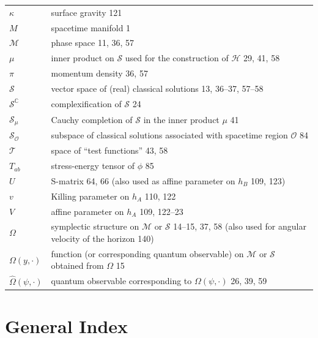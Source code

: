 \documentclass[11pt,a4paper]{article}
\begin{document}
\begin{longtable}[]{@{}
  >{\raggedright\arraybackslash}p{}
  >{\raggedright\arraybackslash}p{}@{}}
\(\kappa\) & surface gravity 121 \\
\(M\) & spacetime manifold 1 \\
\(\mathcal{M}\) & phase space 11, 36, 57 \\
\(\mu\) & inner product on \(\mathcal{S}\) used for the construction of \(\mathcal{H}\) 29, 41, 58 \\
\(\pi\) & momentum density 36, 57 \\
\(\mathcal{S}\) & vector space of (real) classical solutions 13, 36--37, 57--58 \\
\(\mathcal{S}^{\mathbb{C}}\) & complexification of \(\mathcal{S}\) 24 \\
\(\mathcal{S}_{\mu}\) & Cauchy completion of \(\mathcal{S}\) in the inner product \(\mu\) 41 \\
\(\mathcal{S}_{\mathcal{O}}\) & subspace of classical solutions associated with spacetime region \(\mathcal{O}\) 84 \\
\(\mathcal{T}\) & space of ``test functions'' 43, 58 \\
\(T_{ab}\) & stress-energy tensor of \(\phi\) 85 \\
\(U\) & S-matrix 64, 66 (also used as affine parameter on \(h_B\) 109, 123) \\
\(v\) & Killing parameter on \(h_A\) 110, 122 \\
\(V\) & affine parameter on \(h_A\) 109, 122--23 \\
\(\Omega\) & symplectic structure on \(\mathcal{M}\) or \(\mathcal{S}\) 14--15, 37, 58 (also used for angular velocity of the horizon 140) \\
\(\Omega(y,\cdot)\) & function (or corresponding quantum observable) on \(\mathcal{M}\) or \(\mathcal{S}\) obtained from \(\Omega\) 15 \\
\(\hat{\Omega}(\psi,\cdot)\) & quantum observable corresponding to \(\Omega(\psi,\cdot)\) 26, 39, 59 \\
\end{longtable}
\endgroup

\clearpage
\hypertarget{source-215}{}

\hypertarget{source-216}{}
\section*{General Index}
\end{document}
